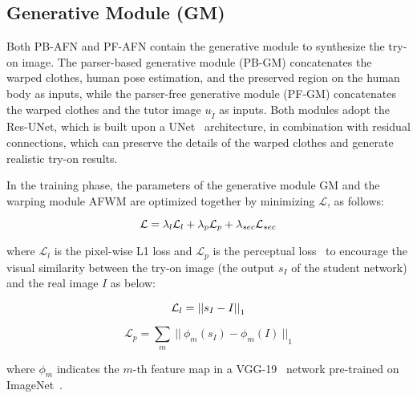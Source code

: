 \documentclass[final]{cvpr}
\begin{document}
		
	
	
	\subsection{Generative Module (GM)} \label{sec:gm}
Both PB-AFN and PF-AFN contain the generative module to synthesize the try-on image.
The parser-based generative module (PB-GM) concatenates the warped clothes, human pose estimation, and the preserved region on the human body as inputs, while the parser-free generative module (PF-GM) concatenates the warped clothes and the tutor image ${u}_{\widetilde{I}}$ as inputs.
Both modules adopt the Res-UNet, which is built upon a UNet~\cite{unet} architecture, in combination with residual connections, which can preserve the details of the warped clothes and generate realistic try-on results.
	
In the training phase, the parameters of the generative module GM and the warping module AFWM are optimized together by minimizing $\mathcal{L}$, as follows:
	\begin{small}
		\begin{equation}
			\setlength\abovedisplayskip{3pt}\setlength\belowdisplayskip{3pt}
			\mathcal{L} = {\lambda}_l\mathcal{L}_l + {\lambda}_p\mathcal{L}_p + {\lambda}_{sec}\mathcal{L}_{sec}
		\end{equation}
	\end{small}
where $\mathcal{L}_l$ is the pixel-wise L1 loss and $\mathcal{L}_p$ is the perceptual loss~\cite{perceptual} to encourage the visual similarity between the try-on image (\ie the output $s_I$ of the student network) and the real image $I$ as below:
\begin{small}
		\begin{equation}	
			\setlength\abovedisplayskip{3pt}\setlength\belowdisplayskip{-5pt}
			\mathcal{L}_l = {||s_I-I||}_1
		\end{equation}
	\end{small}
	\begin{small}
		\begin{equation}		
			\mathcal{L}_p = \sum_{m}~{||~{\phi}_m(s_I)-{\phi}_m(I)~||}_1
		\end{equation}
	\end{small}
	where ${\phi}_m$ indicates the $m$-th feature map in a VGG-19~\cite{vgg} network pre-trained on ImageNet~\cite{imagenet}. 
	
	
	
\end{document}
